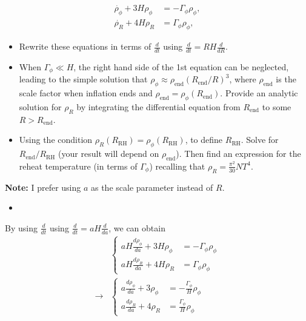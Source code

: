 \begin{align}
    \dot{\rho_\phi}+3H\rho_\phi&=-\Gamma_\phi\rho_\phi,  \\
    \dot{\rho_R}+4H\rho_R&=\Gamma_\phi\rho_\phi,
\end{align}
\begin{itemize}
    \item [(a)] Rewrite these equations in terms of $\frac{d}{dt}$ using $\frac{d}{dt}=RH \frac{d}{dR}$.
    \item [(b)] When $\Gamma_\phi\ll H$, the right hand side of the 1st equation can be neglected, leading to the simple solution that $\rho_\phi\approx\rho_\text{end} (R_{\text{end}}/R)^3$, where $\rho_\text{end}$ is the scale factor when inflation ends and $\rho_\text{end}=\rho_\phi(R_\text{end})$. Provide an analytic solution for $\rho_R$ by integrating the differential equation from $R_\text{end}$ to some $R > R_\text{end}$.
    \item [(c)] Using the condition $\rho_R(R_\text{RH})=\rho_\phi(R_\text{RH})$, to define $R_\text{RH}$. Solve for $R_\text{end}/R_\text{RH}$ (your result will depend on $\rho_\text{end}$). Then find an expression for the reheat temperature (in terms of $\Gamma_\phi$) recalling that $\rho_R=\frac{\pi^2}{30} N T^4$.
\end{itemize}
\answer{}
\textbf{Note:} I prefer using $a$ as the scale parameter instead of $R$.
\begin{itemize}
    \item [(a)]
\end{itemize}
By using $\frac{d}{dt}$ using $\frac{d}{dt}=aH \frac{d}{da}$, we can obtain 
\begin{align}
    &\begin{cases}
        aH \frac{d\rho_\phi}{da}+3H \rho_\phi&=-\Gamma_\phi\rho_\phi\\
        aH \frac{d\rho_R}{da}+4H \rho_R&=\Gamma_\phi\rho_\phi
    \end{cases}\\
    \rightarrow &
    \begin{cases}
        a\frac{d\rho_\phi}{da}+3 \rho_\phi&=-\frac{\Gamma_\phi}{H} \rho_\phi\\
        a \frac{d\rho_R}{da}+4 \rho_R&=\frac{\Gamma_\phi}{H}\rho_\phi
    \end{cases}
\end{align}

